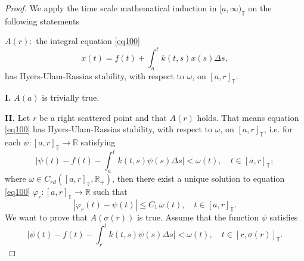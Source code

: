 \documentclass{article}
\newcommand{\q}{\quad}
\begin{document}
\begin{proof}
We apply the time scale mathematical induction in $[a,\infty)_\mathbb{T}$ on the following statements

$A(r):$ the integral equation \eqref{eq100}
$$
x(t)=f(t)+\int_a^tk(t,s)x(s)\Delta s,
$$
has Hyers-Ulam-Rassias stability, with respect to $\omega$, on $[a,r]_\mathbb{T}$.

\textbf{I.} $A(a)$ is trivially true.

\textbf{II.} Let $r$ be a right scattered point and that $A(r)$ holds. That means equation \eqref{eq100} has Hyers-Ulam-Rassias stability, with respect to $\omega$, on $[a,r]_\mathbb{T}$, i.e. for each $\psi:[a,r]_{\mathbb{T}}\rightarrow \mathbb{R}$ satisfying
$$
\Big|\psi(t)-f(t)-\int_a^tk(t,s)\psi(s)\Delta s\Big|<\omega(t), \q  t \in [a,r]_\mathbb{T};
$$
where $\omega\in C_{rd}([a,r]_\mathbb{T},\mathbb{R}_+)$, then there exist a unique solution to equation \eqref{eq100} $\varphi_r:[a,r]_\mathbb{T}\rightarrow \mathbb{R}$ such that
$$
|\varphi_r(t)-\psi(t)|\leq C_1\,\omega(t),\q  t \in [a,r]_\mathbb{T}.
$$
We want to prove that $A(\sigma(r))$ is true. Assume that the function $\psi$ satisfies
$$
\Big|\psi(t)-f(t)-\int_r^tk(t,s)\psi(s)\Delta s\Big|<\omega(t), \q  t \in [r,\sigma(r)]_\mathbb{T}.
$$


\end{proof}
\end{document}
